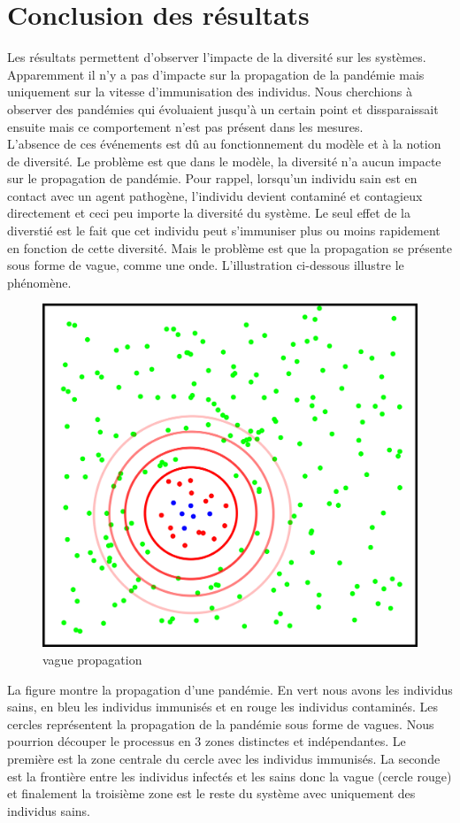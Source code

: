 \section{Conclusion des résultats}

Les résultats permettent d'observer l'impacte de la diversité sur les systèmes. Apparemment il n'y a pas d'impacte sur la propagation de la pandémie mais uniquement sur la vitesse d'immunisation des individus. Nous cherchions à observer des pandémies qui évoluaient jusqu'à un certain point et dissparaissait ensuite mais ce comportement n'est pas présent dans les mesures.\\

L'absence de ces événements est dû au fonctionnement du modèle et à la notion de diversité. Le problème est que dans le modèle, la diversité n'a aucun impacte sur le propagation de pandémie. Pour rappel, lorsqu'un individu sain est en contact avec un agent pathogène, l'individu devient contaminé et contagieux directement et ceci peu importe la diversité du système. Le seul effet de la diverstié est le fait que cet individu peut s'immuniser plus ou moins rapidement en fonction de cette diversité. Mais le problème est que la propagation se présente sous forme de vague, comme une onde. L'illustration ci-dessous illustre le phénomène.

\begin{figure}[h]
	\centering
	\captionsetup{justification=centering}
	\includegraphics[width=.5\textwidth]{Images/vague_propagation.png}
	\caption{vague propagation}
\end{figure}

La figure montre la propagation d'une pandémie. En vert nous avons les individus sains, en bleu les individus immunisés et en rouge les individus contaminés. Les cercles représentent la propagation de la pandémie sous forme de vagues. Nous pourrion découper le processus en 3 zones distinctes et indépendantes. Le première est la zone centrale du cercle avec les individus immunisés. La seconde est la frontière entre les individus infectés et les sains donc la vague (cercle rouge) et finalement la troisième zone est le reste du système avec uniquement des individus sains.\\

